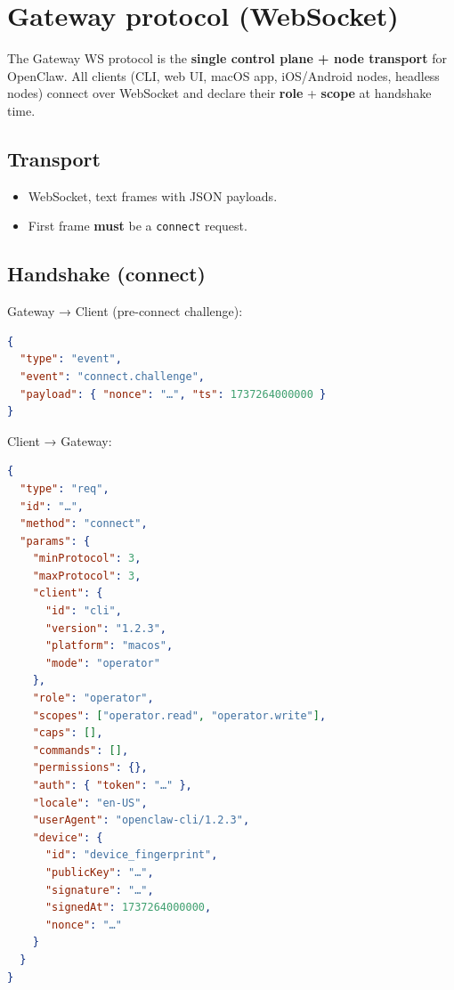 \clearpage

\section{Gateway protocol (WebSocket)}


The Gateway WS protocol is the \textbf{single control plane + node transport} for
OpenClaw. All clients (CLI, web UI, macOS app, iOS/Android nodes, headless
nodes) connect over WebSocket and declare their \textbf{role} + \textbf{scope} at
handshake time.

\subsection{Transport}


\begin{itemize}
  \item WebSocket, text frames with JSON payloads.
  \item First frame \textbf{must} be a \texttt{connect} request.
\end{itemize}


\subsection{Handshake (connect)}


Gateway → Client (pre-connect challenge):

\begin{lstlisting}[language=json]
{
  "type": "event",
  "event": "connect.challenge",
  "payload": { "nonce": "…", "ts": 1737264000000 }
}
\end{lstlisting}


Client → Gateway:

\begin{lstlisting}[language=json]
{
  "type": "req",
  "id": "…",
  "method": "connect",
  "params": {
    "minProtocol": 3,
    "maxProtocol": 3,
    "client": {
      "id": "cli",
      "version": "1.2.3",
      "platform": "macos",
      "mode": "operator"
    },
    "role": "operator",
    "scopes": ["operator.read", "operator.write"],
    "caps": [],
    "commands": [],
    "permissions": {},
    "auth": { "token": "…" },
    "locale": "en-US",
    "userAgent": "openclaw-cli/1.2.3",
    "device": {
      "id": "device_fingerprint",
      "publicKey": "…",
      "signature": "…",
      "signedAt": 1737264000000,
      "nonce": "…"
    }
  }
}
\end{lstlisting}


